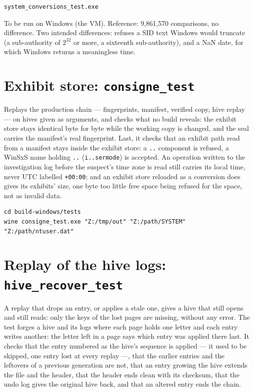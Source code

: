 \documentclass[11pt,a4paper,oneside]{report}
\begin{document}
\begin{lstlisting}
system_conversions_test.exe
\end{lstlisting}

To be run on Windows (the VM). Reference: 9,861,570 comparisons, no difference.
Two intended differences: \wac{} refuses a SID text Windows would truncate (a
sub-authority of $2^{32}$ or more, a sixteenth sub-authority), and a NaN date,
for which Windows returns a meaningless time.

\section{Exhibit store: \texttt{consigne\_test}}

Replays the production chain — fingerprints, manifest, verified copy, hive
replay — on hives given as arguments, and checks what no build reveals: the
exhibit store stays identical byte for byte while the working copy is changed,
and the seal carries the manifest's real fingerprint. Last, it checks that an
exhibit path read from a manifest stays inside the exhibit store: a
\texttt{..} component is refused, a WinSxS name holding \texttt{..}
(\texttt{i..sermode}) is accepted. An operation written to the investigation log
before the suspect's time zone is read still carries its local time, never
UTC labelled \texttt{+00:00}; and an exhibit store reloaded as a conversion
does gives its exhibits' size, one byte too little free space being refused
for the space, not as invalid data.

\begin{lstlisting}
cd build-windows/tests
wine consigne_test.exe "Z:/tmp/out" "Z:/path/SYSTEM" "Z:/path/ntuser.dat"
\end{lstlisting}

\section{Replay of the hive logs: \texttt{hive\_recover\_test}}

A replay that drops an entry, or applies a stale one, gives a hive that still
opens and still reads: only the keys of the lost pages are missing, without any
error. The test forges a hive and its logs where each page holds one letter and
each entry writes another: the letter left in a page says which entry was
applied there last. It checks that the entry numbered as the hive's sequence is
applied — it used to be skipped, one entry lost at every replay —, that the
earlier entries and the leftovers of a previous generation are not, that an
entry growing the hive extends the file and the header, that the header ends
clean with its checksum, that the undo log gives the original hive back, and
that an altered entry ends the chain.
\end{document}
